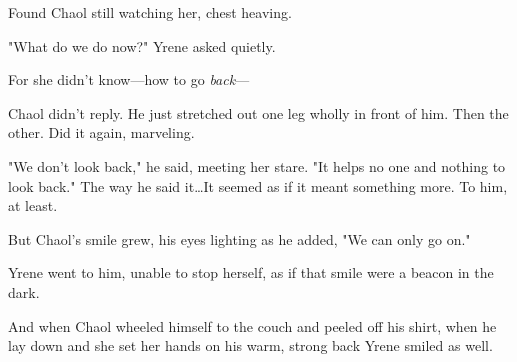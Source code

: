 Found Chaol still watching her, chest heaving.

"What do we do now?"
Yrene asked quietly.

For she didn't know---how to go \emph{back}---

Chaol didn't reply.
He just stretched out one leg wholly in front of him.
Then the other.
Did it again, marveling.

"We don't look back," he said, meeting her stare.
"It helps no one and nothing to look back."
The way he said it\ldots It seemed as if it meant something more.
To him, at least.

But Chaol's smile grew, his eyes lighting as he added, "We can only go on."

Yrene went to him, unable to stop herself, as if that smile were a beacon in the dark.

And when Chaol wheeled himself to the couch and peeled off his shirt, when he lay down and she set her hands on his warm, strong back 
Yrene smiled as well.

